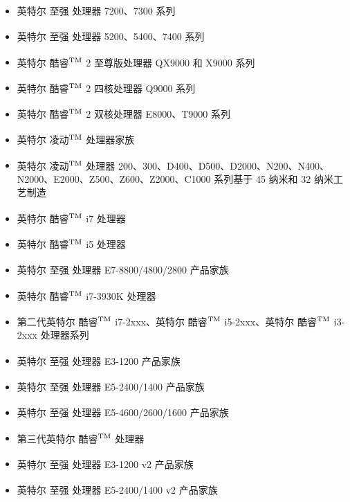 \documentclass{article}
\begin{document}
\begin{itemize}
\item 英特尔\textsuperscript{\textregistered}  至强\textsuperscript{\textregistered}  处理器 7200、7300 系列
\item 英特尔\textsuperscript{\textregistered}  至强\textsuperscript{\textregistered}  处理器 5200、5400、7400 系列
\item 英特尔\textsuperscript{\textregistered}  酷睿$^{\rm{TM}}$ 2 至尊版处理器 QX9000 和 X9000 系列
\item 英特尔\textsuperscript{\textregistered}  酷睿$^{\rm{TM}}$ 2 四核处理器 Q9000 系列
\item 英特尔\textsuperscript{\textregistered}  酷睿$^{\rm{TM}}$ 2 双核处理器 E8000、T9000 系列
\item 英特尔\textsuperscript{\textregistered}  凌动$^{\rm{TM}}$ 处理器家族
\item 英特尔\textsuperscript{\textregistered}  凌动$^{\rm{TM}}$ 处理器 200、300、D400、D500、D2000、N200、N400、N2000、E2000、Z500、Z600、Z2000、C1000 系列基于 45 纳米和 32 纳米工艺制造
\item 英特尔\textsuperscript{\textregistered}  酷睿$^{\rm{TM}}$ i7 处理器
\item 英特尔\textsuperscript{\textregistered}  酷睿$^{\rm{TM}}$ i5 处理器
\item 英特尔\textsuperscript{\textregistered}  至强\textsuperscript{\textregistered}  处理器 E7-8800/4800/2800 产品家族
\item 英特尔\textsuperscript{\textregistered}  酷睿$^{\rm{TM}}$ i7-3930K 处理器
\item 第二代英特尔\textsuperscript{\textregistered}  酷睿$^{\rm{TM}}$ i7-2xxx、英特尔\textsuperscript{\textregistered}  酷睿$^{\rm{TM}}$ i5-2xxx、英特尔\textsuperscript{\textregistered}  酷睿$^{\rm{TM}}$ i3-2xxx 处理器系列
\item 英特尔\textsuperscript{\textregistered}  至强\textsuperscript{\textregistered}  处理器 E3-1200 产品家族
\item 英特尔\textsuperscript{\textregistered}  至强\textsuperscript{\textregistered}  处理器 E5-2400/1400 产品家族
\item 英特尔\textsuperscript{\textregistered}  至强\textsuperscript{\textregistered}  处理器 E5-4600/2600/1600 产品家族
\item 第三代英特尔\textsuperscript{\textregistered}  酷睿$^{\rm{TM}}$ 处理器
\item 英特尔\textsuperscript{\textregistered}  至强\textsuperscript{\textregistered}  处理器 E3-1200 v2 产品家族
\item 英特尔\textsuperscript{\textregistered}  至强\textsuperscript{\textregistered}  处理器 E5-2400/1400 v2 产品家族

\end{itemize}
\end{document}
